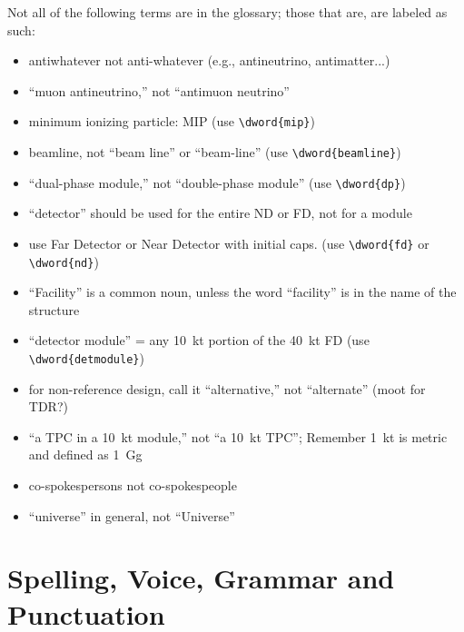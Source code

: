 Not all of the following terms are in the glossary; those that are, are labeled as such:
\begin{itemize}
\item antiwhatever not anti-whatever (e.g., antineutrino, antimatter...)
\item ``muon antineutrino,'' not ``antimuon neutrino''
\item minimum ionizing particle: MIP (use \verb|\dword{mip}|)
\item beamline, not ``beam line'' or ``beam-line'' (use \verb|\dword{beamline}|)
\item ``dual-phase module,'' not ``double-phase module'' (use \verb|\dword{dp}|)
\item ``detector'' should be used for the entire ND or FD, not for a module
\item use Far Detector or Near Detector with initial caps. (use \verb|\dword{fd}| or \verb|\dword{nd}|)
\item  ``Facility'' is a common noun, unless the word ``facility'' is in the name of the structure
\item ``detector module'' = any \SI{10}{kt} portion of the \SI{40}{kt} FD (use \verb|\dword{detmodule}|)
\item for non-reference design, call it ``alternative,'' not ``alternate'' (moot for TDR?)
\item ``a TPC in a \SI{10}{kt} module,'' not ``a \SI{10}{kt}  TPC''; Remember \SI{1}{kt} is metric and defined as \SI{1}{Gg}
\item co-spokespersons not co-spokespeople
\item ``universe'' in general, not ``Universe''
\end{itemize}

\section{Spelling, Voice, Grammar and Punctuation}
\label{sec:english-spelling}

